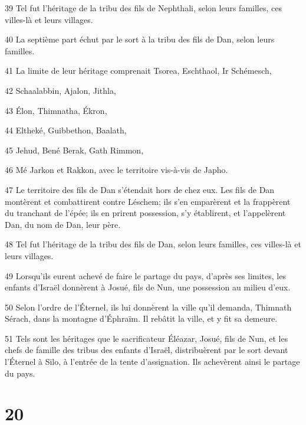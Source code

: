 \par 39 Tel fut l'héritage de la tribu des fils de Nephthali, selon leurs familles, ces villes-là et leurs villages.
\par 40 La septième part échut par le sort à la tribu des fils de Dan, selon leurs familles.
\par 41 La limite de leur héritage comprenait Tsorea, Eschthaol, Ir Schémesch,
\par 42 Schaalabbin, Ajalon, Jithla,
\par 43 Élon, Thimnatha, Ékron,
\par 44 Eltheké, Guibbethon, Baalath,
\par 45 Jehud, Bené Berak, Gath Rimmon,
\par 46 Mé Jarkon et Rakkon, avec le territoire vis-à-vis de Japho.
\par 47 Le territoire des fils de Dan s'étendait hors de chez eux. Les fils de Dan montèrent et combattirent contre Léschem; ils s'en emparèrent et la frappèrent du tranchant de l'épée; ils en prirent possession, s'y établirent, et l'appelèrent Dan, du nom de Dan, leur père.
\par 48 Tel fut l'héritage de la tribu des fils de Dan, selon leurs familles, ces villes-là et leurs villages.
\par 49 Lorsqu'ils eurent achevé de faire le partage du pays, d'après ses limites, les enfants d'Israël donnèrent à Josué, fils de Nun, une possession au milieu d'eux.
\par 50 Selon l'ordre de l'Éternel, ils lui donnèrent la ville qu'il demanda, Thimnath Sérach, dans la montagne d'Éphraïm. Il rebâtit la ville, et y fit sa demeure.
\par 51 Tels sont les héritages que le sacrificateur Éléazar, Josué, fils de Nun, et les chefs de famille des tribus des enfants d'Israël, distribuèrent par le sort devant l'Éternel à Silo, à l'entrée de la tente d'assignation. Ils achevèrent ainsi le partage du pays.

\chapter{20}

